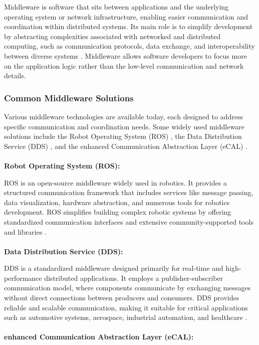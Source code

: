Middleware is software that sits between applications and the underlying operating system or network infrastructure, enabling easier communication and coordination within distributed systems. Its main role is to simplify development by abstracting complexities associated with networked and distributed computing, such as communication protocols, data exchange, and interoperability between diverse systems \cite{bernstein1996}. Middleware allows software developers to focus more on the application logic rather than the low-level communication and network details.

\subsubsection{Common Middleware Solutions}

Various middleware technologies are available today, each designed to address specific communication and coordination needs. 
Some widely used middleware solutions include the Robot Operating System (ROS) \cite{quigley2009}, the Data Distribution Service (DDS) \cite{pardo2003}, and the enhanced Communication Abstraction Layer (eCAL) \cite{ecal_official_docs}.
\\
\\
\textbf{Robot Operating System (ROS):}

ROS is an open-source middleware widely used in robotics. It provides a structured communication framework that includes services like message passing, data visualization, hardware abstraction, and numerous tools for robotics development. ROS simplifies building complex robotic systems by offering standardized communication interfaces and extensive community-supported tools and libraries \cite{quigley2009}.
\\
\\
\textbf{Data Distribution Service (DDS):}

DDS is a standardized middleware designed primarily for real-time and high-performance distributed applications. It employs a publisher-subscriber communication model, where components communicate by exchanging messages without direct connections between producers and consumers. DDS provides reliable and scalable communication, making it suitable for critical applications such as automotive systems, aerospace, industrial automation, and healthcare \cite{pardo2003}.
\\
\\
\textbf{enhanced Communication Abstraction Layer (eCAL):}

